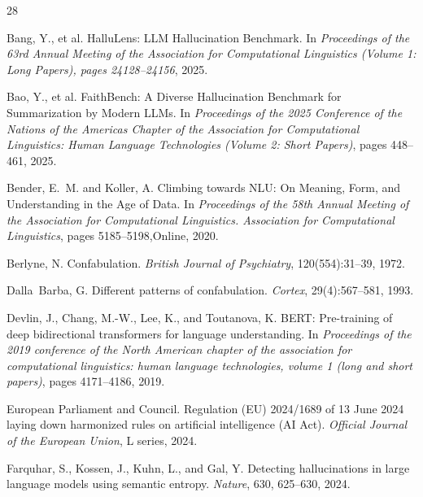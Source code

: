 \documentclass[11pt]{article}
\begin{document}
\begin{thebibliography}{28}

Bang, Y., et al.
\newblock HalluLens: LLM Hallucination Benchmark.
\newblock In \emph{Proceedings of the 63rd Annual Meeting of the Association for Computational Linguistics (Volume 1: Long Papers), pages 24128--24156}, 2025.

Bao, Y., et al.
\newblock FaithBench: A Diverse Hallucination Benchmark for Summarization by Modern LLMs.
\newblock In \emph{Proceedings of the 2025 Conference of the Nations of the Americas Chapter of the Association for Computational Linguistics: Human Language Technologies (Volume 2: Short Papers)}, pages 448--461, 2025.

Bender, E.~M. and Koller, A.
\newblock Climbing towards NLU: On Meaning, Form, and Understanding in the Age of Data.
\newblock In \emph{Proceedings of the 58th Annual Meeting of the Association for Computational Linguistics. Association for Computational Linguistics}, pages 5185--5198,Online, 2020.

Berlyne, N.
\newblock Confabulation.
\newblock \emph{British Journal of Psychiatry}, 120(554):31--39, 1972.

Dalla~Barba, G.
\newblock Different patterns of confabulation.
\newblock \emph{Cortex}, 29(4):567--581, 1993.

Devlin, J., Chang, M.-W., Lee, K., and Toutanova, K.
\newblock BERT: Pre-training of deep bidirectional transformers for language understanding.
\newblock In \emph{Proceedings of the 2019 conference of the North American chapter of the association for computational linguistics: human language technologies, volume 1 (long and short papers)}, pages 4171--4186, 2019.

European Parliament and Council.
\newblock Regulation (EU) 2024/1689 of 13 June 2024 laying down harmonized rules on artificial intelligence (AI Act).
\newblock \emph{Official Journal of the European Union}, L series, 2024.

Farquhar, S., Kossen, J., Kuhn, L., and Gal, Y.
\newblock Detecting hallucinations in large language models using semantic entropy.
\newblock \emph{Nature}, 630, 625--630, 2024.


\end{thebibliography}
\end{document}

